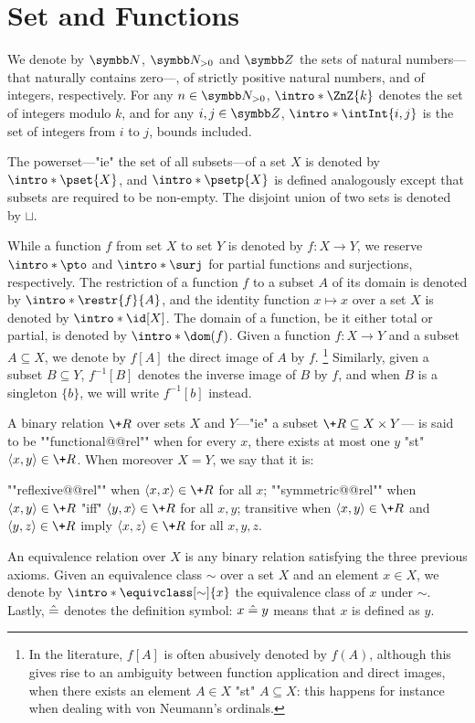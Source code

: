 \section{Set and Functions}

We denote by $\N$, $\Np$ and $\Z$ the sets of natural numbers---that naturally contains zero---,
of strictly positive natural numbers, and of integers, respectively.
For any $n\in\Np$, \AP$\intro*\ZnZ{k}$ denotes the set of integers modulo $k$,
and for any $i,j \in \Z$, $\intro*\intInt{i,j}$ is the set of integers from $i$ to $j$,
bounds included.

The powerset---"ie" the set of all subsets---of a set $X$
is denoted by $\intro*\pset{X}$, and $\intro*\psetp{X}$ is defined analogously
except that subsets are required to be non-empty.
The disjoint union of two sets is denoted by $\sqcup$.

While a function $f$ from set $X$ to set $Y$ is denoted by $f\colon X \to Y$,
we reserve $\intro*\pto$ and $\intro*\surj$ for partial functions and surjections, respectively.
The restriction of a function $f$ to a subset $A$ of its domain is denoted by
$\intro*\restr{f}{A}$, and the identity function $x \mapsto x$ over a set $X$
is denoted by $\intro*\id[X]$.
The domain of a function, be it either total or partial, is denoted
by \AP$\intro*\dom(f)$.
Given a function $f\colon X \to Y$ and a subset $A \subseteq X$,
we denote by $f[A]$ the direct image of $A$ by $f$.%
\footnote{In the literature, $f[A]$ is often abusively denoted by $f(A)$, although
this gives rise to an ambiguity between function application and direct images,
when there exists an element $A \in X$ "st" $A \subseteq X$: this happens for instance
when dealing with von Neumann's ordinals.}
Similarly, given a subset $B \subseteq Y$, $f^{-1}[B]$ denotes
the inverse image of $B$ by $f$, and when $B$ is a singleton $\{b\}$,
we will write $f^{-1}[b]$ instead.%

A binary relation $\+R$ over sets $X$ and $Y$---"ie" a subset $\+R \subseteq X \times Y$---
is said to be \AP""functional@@rel"" when for every $x$, there exists at most one $y$
"st" $\tup{x,y} \in \+R$.
When moreover $X = Y$, we say that it is:
\begin{itemize}
	\itemAP ""reflexive@@rel"" when $\tup{x,x} \in \+R$ for all $x$;
	\itemAP ""symmetric@@rel"" when $\tup{x,y} \in \+R$ "iff" $\tup{y,x} \in \+R$
		for all $x,y$;
	\itemAP transitive when $\tup{x,y} \in \+R$ and $\tup{y,z} \in \+R$
		imply $\tup{x,z} \in \+R$
		for all $x,y,z$.
\end{itemize}
An equivalence relation over $X$ is any binary relation satisfying the three previous axioms.
Given an equivalence class $\sim$ over a set $X$ and an element $x \in X$,
we denote by $\intro*\equivclass[\sim]{x}$ the equivalence class of $x$ under $\sim$.
Lastly, $\mathrel{\hat{=}}$ denotes the definition symbol: $x \mathrel{\hat{=}} y$ means that $x$ is defined as $y$.

